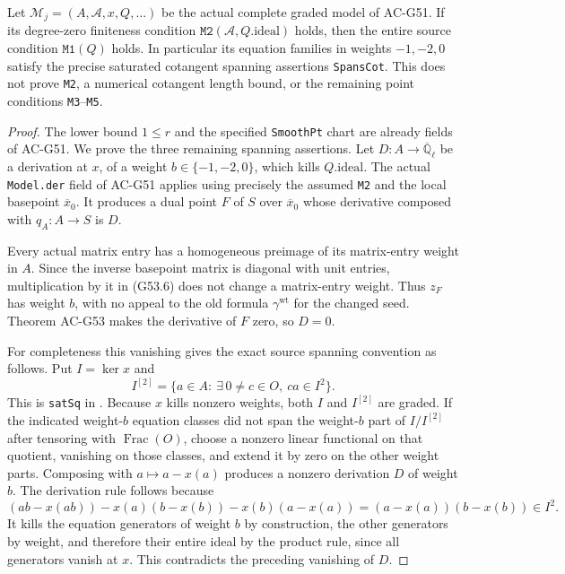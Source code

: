 \begin{corollary}
\label{AC-G53-M1}
Let $\mathcal M_j=(A,\mathcal A,x,Q,\ldots)$ be the
actual complete graded model of AC-G51.  If its
degree-zero finiteness condition
$\texttt{M2}(\mathcal A,Q.\mathrm{ideal})$ holds,
then the entire source condition $\texttt{M1}(Q)$ holds.
In particular its equation families in weights
$-1,-2,0$ satisfy the precise saturated cotangent
spanning assertions \texttt{SpansCot}.
This does not prove \texttt{M2}, a numerical cotangent
length bound, or the remaining point conditions
\texttt{M3}--\texttt{M5}.
\end{corollary}
\begin{proof}
The lower bound $1\leq r$ and the specified
\texttt{SmoothPt} chart are already fields of AC-G51.
We prove the three remaining spanning assertions.
Let $D:A\to\overline{\mathbb Q}_\ell$ be a derivation
at $x$, of a weight $b\in\{-1,-2,0\}$, which kills
$Q.\mathrm{ideal}$.
The actual \texttt{Model.der} field of AC-G51 applies
using precisely the assumed \texttt{M2} and the local
basepoint $\overline{x}_0$.
It produces a dual point $F$ of $S$ over
$\overline{x}_0$ whose derivative composed with
$q_A:A\to S$ is $D$.

Every actual matrix entry has a homogeneous preimage
of its matrix-entry weight in $A$.
Since the inverse basepoint matrix is diagonal with
unit entries, multiplication by it in (G53.6) does
not change a matrix-entry weight.
Thus $z_F$ has weight $b$, with no appeal to the old
formula $\gamma^{\mathrm{wt}}$ for the changed seed.
Theorem AC-G53 makes the derivative of $F$ zero, so
$D=0$.

For completeness this vanishing gives the exact
source spanning convention as follows.
Put $I=\ker x$ and
\[
 I^{[2]}=\{a\in A:\ \exists\,0\ne c\in O,\ ca\in I^2\}.
                                                               \tag{G53.11}
\]
This is \texttt{satSq} in
.
Because $x$ kills nonzero weights, both $I$ and
$I^{[2]}$ are graded.
If the indicated weight-$b$ equation classes did
not span the weight-$b$ part of $I/I^{[2]}$ after
tensoring with $\operatorname{Frac}(O)$, choose a
nonzero linear functional on that quotient,
vanishing on those classes, and extend it by zero
on the other weight parts.  Composing with
$a\mapsto a-x(a)$ produces a nonzero derivation
$D$ of weight $b$.
The derivation rule follows because
\[
 (ab-x(ab))-x(a)(b-x(b))-x(b)(a-x(a))
                         =(a-x(a))(b-x(b))\in I^2.
\]
It kills the equation generators of weight $b$ by
construction, the other generators by weight, and
therefore their entire ideal by the product rule,
since all generators vanish at $x$.
This contradicts the preceding vanishing of $D$.


\end{proof}
